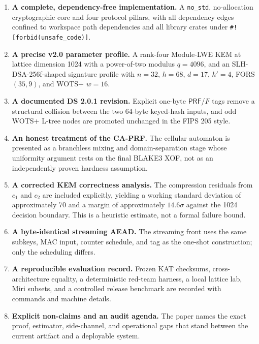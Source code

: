 \documentclass[11pt,a4paper]{article}
\theoremstyle{plain}
\theoremstyle{definition}
\theoremstyle{remark}
\newcommand{\PRF}{\mathsf{PRF}}
\begin{document}
\begin{enumerate}[leftmargin=*]
\item \textbf{A complete, dependency-free implementation.}  A
  \texttt{no\_std}, no-allocation cryptographic core and four protocol
  pillars, with all dependency edges confined to workspace path
  dependencies and all library crates under
  \texttt{\#![forbid(unsafe\_code)]}.

\item \textbf{A precise v2.0 parameter profile.}  A rank-four
  Module-LWE KEM at lattice dimension 1024 with a power-of-two modulus
  $q=4096$, and an SLH-DSA-256f-shaped signature profile with
  $n=32$, $h=68$, $d=17$, $h'=4$, FORS $(35,9)$, and WOTS+ $w=16$.

\item \textbf{A documented DS 2.0.1 revision.}  Explicit one-byte
  $\PRF$/$F$ tags remove a structural collision between the two
  64-byte keyed-hash inputs, and odd WOTS+ L-tree nodes are promoted
  unchanged in the FIPS 205 style.

\item \textbf{An honest treatment of the CA-PRF.}  The cellular
  automaton is presented as a branchless mixing and domain-separation
  stage whose uniformity argument rests on the final BLAKE3 XOF, not
  as an independently proven hardness assumption.

\item \textbf{A corrected KEM correctness analysis.}  The compression
  residuals from $c_1$ and $c_2$ are included explicitly, yielding a
  working standard deviation of approximately 70 and a margin of
  approximately $14.6\sigma$ against the 1024 decision boundary.  This
  is a heuristic estimate, not a formal failure bound.

\item \textbf{A byte-identical streaming AEAD.}  The streaming front
  uses the same subkeys, MAC input, counter schedule, and tag as the
  one-shot construction; only the scheduling differs.

\item \textbf{A reproducible evaluation record.}  Frozen KAT checksums,
  cross-architecture equality, a deterministic red-team harness, a
  local lattice lab, Miri subsets, and a controlled release benchmark
  are recorded with commands and machine details.

\item \textbf{Explicit non-claims and an audit agenda.}  The paper names
  the exact proof, estimator, side-channel, and operational gaps that
  stand between the current artifact and a deployable system.
\end{enumerate}
\end{document}
